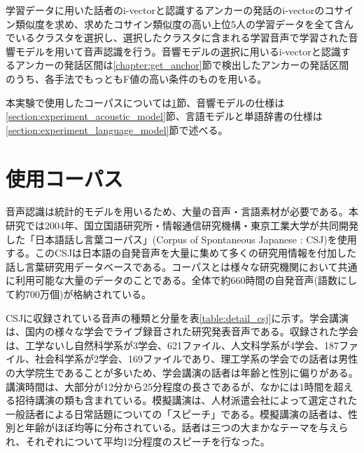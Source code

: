 学習データに用いた話者のi-vectorと認識するアンカーの発話のi-vectorのコサイン類似度を求め、求めたコサイン類似度の高い上位5人の学習データを全て含んでいるクラスタを選択し、選択したクラスタに含まれる学習音声で学習された音響モデルを用いて音声認識を行う。音響モデルの選択に用いるi-vectorと認識するアンカーの発話区間は\ref{chapter:get_anchor}節で検出したアンカーの発話区間のうち、各手法でもっともF値の高い条件のものを用いる。\par

本実験で使用したコーパスについては\ref{csj}節、音響モデルの仕様は\ref{section:experiment_acoustic_model}節、言語モデルと単語辞書の仕様は\ref{section:experiment_language_model}節で述べる。

\section{使用コーパス}
\label{csj}
音声認識は統計的モデルを用いるため、大量の音声・言語素材が必要である。本研究では2004年、国立国語研究所・情報通信研究機構・東京工業大学が共同開発した「日本語話し言葉コーパス」(Corpus of Spontaneous Japanese : CSJ)を使用する。このCSJは日本語の自発音声を大量に集めて多くの研究用情報を付加した話し言葉研究用データベースである。コーパスとは様々な研究機関において共通に利用可能な大量のデータのことである。全体で約660時間の自発音声(語数にして約700万個)が格納されている。\par
CSJに収録されている音声の種類と分量を表\ref{table:detail_csj}に示す。学会講演は、国内の様々な学会でライブ録音された研究発表音声である。収録された学会は、工学ないし自然科学系が3学会、621ファイル、人文科学系が4学会、187ファイル、社会科学系が2学会、169ファイルであり、理工学系の学会での話者は男性の大学院生であることが多いため、学会講演の話者は年齢と性別に偏りがある。講演時間は、大部分が12分から25分程度の長さであるが、なかには1時間を超える招待講演の類も含まれている。模擬講演は、人材派遣会社によって選定された一般話者による日常話題についての「スピーチ」である。模擬講演の話者は、性別と年齢がほぼ均等に分布されている。話者は三つの大まかなテーマを与えられ、それぞれについて平均12分程度のスピーチを行なった。\par

